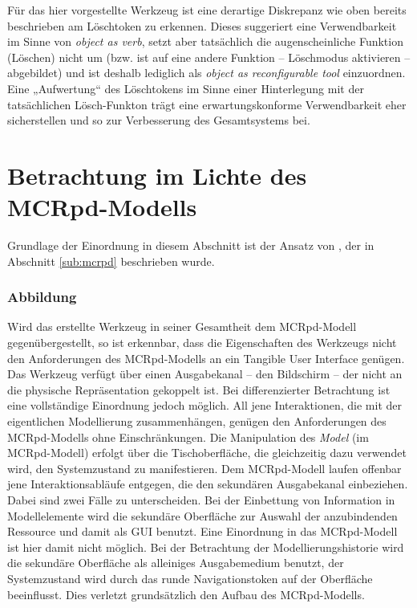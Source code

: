Für das hier vorgestellte Werkzeug ist eine derartige Diskrepanz wie oben bereits beschrieben am Löschtoken zu erkennen. Dieses suggeriert eine Verwendbarkeit im Sinne von \emph{object as verb}, setzt aber tatsächlich die augenscheinliche Funktion (Löschen) nicht um (bzw. ist auf eine andere Funktion -- Löschmodus aktivieren -- abgebildet) und ist deshalb lediglich als \emph{object as reconfigurable tool} einzuordnen. Eine „Aufwertung“ des Löschtokens im Sinne einer Hinterlegung mit der tatsächlichen Lösch-Funkton trägt eine erwartungskonforme Verwendbarkeit eher sicherstellen und so zur Verbesserung des Gesamtsystems bei.


\section{Betrachtung im Lichte des MCRpd-Modells} %
\label{sec:betrachtung_im_lichte_des_mcrpd_modells}

Grundlage der Einordnung in diesem Abschnitt ist der Ansatz von \citet{Ullmer00}, der in Abschnitt \ref{sub:mcrpd} beschrieben wurde.

\subsubsection{Abbildung}

Wird das erstellte Werkzeug in seiner Gesamtheit dem \gls{MCRpd}-Modell gegenübergestellt, so ist erkennbar, dass die Eigenschaften des Werkzeugs nicht den Anforderungen des \gls{MCRpd}-Modells an ein Tangible User Interface genügen. Das Werkzeug verfügt über einen Ausgabekanal -- den Bildschirm -- der nicht an die physische Repräsentation gekoppelt ist. Bei differenzierter Betrachtung ist eine vollständige Einordnung jedoch möglich. All jene Interaktionen, die mit der eigentlichen Modellierung zusammenhängen, genügen den Anforderungen des \gls{MCRpd}-Modells ohne Einschränkungen. Die Manipulation des \emph{Model} (im \gls{MCRpd}-Modell) erfolgt über die Tischoberfläche, die gleichzeitig dazu verwendet wird, den Systemzustand zu manifestieren. Dem \gls{MCRpd}-Modell laufen offenbar jene Interaktionsabläufe entgegen, die den sekundären Ausgabekanal einbeziehen. Dabei sind zwei Fälle zu unterscheiden. Bei der Einbettung von Information in Modellelemente wird die sekundäre Oberfläche zur Auswahl der anzubindenden Ressource und damit als \gls{GUI} benutzt. Eine Einordnung in das \gls{MCRpd}-Modell ist hier damit nicht möglich. Bei der Betrachtung der Modellierungshistorie wird die sekundäre Oberfläche als alleiniges Ausgabemedium benutzt, der Systemzustand wird durch das runde Navigationstoken auf der Oberfläche beeinflusst. Dies verletzt grundsätzlich den Aufbau des MCRpd-Modells.

